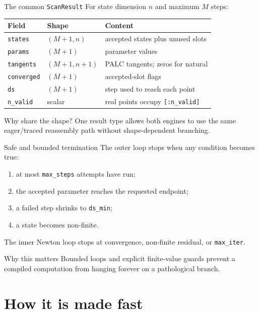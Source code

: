 \documentclass[aspectratio=169,10pt]{beamer}
\begin{document}
\begin{frame}{The common \texttt{ScanResult}}
For state dimension $n$ and maximum $M$ steps:
\begin{center}
\begin{tabular}{lll}
\toprule
Field & Shape & Content\\
\midrule
\texttt{states} & $(M+1,n)$ & accepted states plus unused slots\\
\texttt{params} & $(M+1)$ & parameter values\\
\texttt{tangents} & $(M+1,n+1)$ & PALC tangents; zeros for natural\\
\texttt{converged} & $(M+1)$ & accepted-slot flags\\
\texttt{ds} & $(M+1)$ & step used to reach each point\\
\texttt{n\_valid} & scalar & real points occupy \texttt{[:n\_valid]}\\
\bottomrule
\end{tabular}
\end{center}
\begin{block}{Why share the shape?}
One result type allows both engines to use the same eager/traced reassembly path without shape-dependent branching.
\end{block}
\end{frame}

\begin{frame}{Safe and bounded termination}
The outer loop stops when any condition becomes true:
\begin{enumerate}
  \item at most \texttt{max\_steps} attempts have run;
  \item the accepted parameter reaches the requested endpoint;
  \item a failed step shrinks to \texttt{ds\_min};
  \item a state becomes non-finite.
\end{enumerate}
The inner Newton loop stops at convergence, non-finite residual, or \texttt{max\_iter}.
\begin{block}{Why this matters}
Bounded loops and explicit finite-value guards prevent a compiled computation from hanging forever on a pathological branch.
\end{block}
\end{frame}

\section{How it is made fast}
\end{document}
